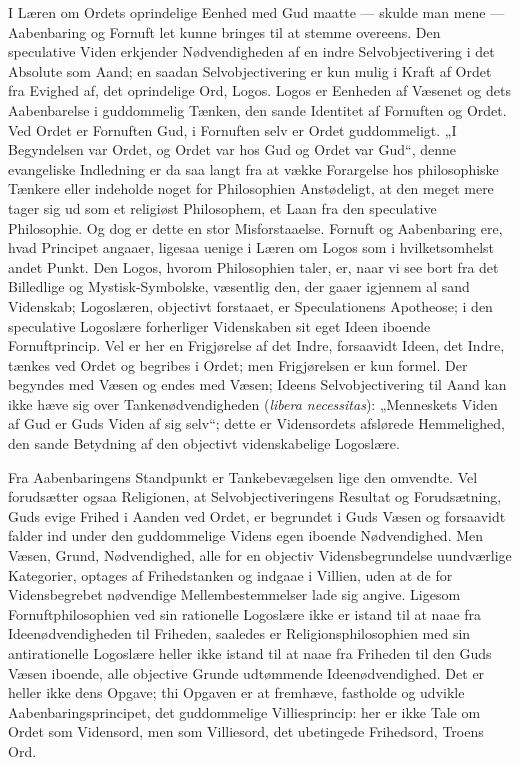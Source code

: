 \documentclass[12pt]{book}
\begin{document}
I Læren om Ordets oprindelige Eenhed med Gud maatte --- skulde man
mene --- Aabenbaring og Fornuft
let kunne bringes til at stemme overeens. Den speculative Viden
erkjender Nødvendigheden af en indre Selvobjectivering i det
Absolute som Aand; en saadan Selvobjectivering er kun mulig i Kraft
af Ordet fra Evighed af, det oprindelige Ord, Logos. Logos er
Eenheden af Væsenet og dets Aabenbarelse i guddommelig Tænken, den
sande Identitet af Fornuften og Ordet. Ved Ordet er Fornuften Gud, i
Fornuften selv er Ordet guddommeligt. „I Begyndelsen var Ordet, og
Ordet var hos Gud og Ordet var Gud“, denne evangeliske Indledning er
da saa langt fra at vække Forargelse hos philosophiske Tænkere eller
indeholde noget for Philosophien Anstødeligt, at den meget mere
tager sig ud som et religiøst Philosophem, et Laan fra den
speculative Philosophie. Og dog er dette en stor Misforstaaelse.
Fornuft og Aabenbaring ere, hvad Principet angaaer, ligesaa uenige i
Læren om Logos som i hvilketsomhelst andet Punkt. Den Logos, hvorom
Philosophien taler, er, naar vi see bort fra det Billedlige og
Mystisk-Symbolske, væsentlig den, der gaaer igjennem al sand
Videnskab; Logoslæren, objectivt forstaaet, er Speculationens
Apotheose; i den speculative Logoslære forherliger Videnskaben sit
eget Ideen iboende Fornuftprincip. Vel er her en Frigjørelse af det
Indre, forsaavidt Ideen, det Indre, tænkes ved Ordet og begribes i
Ordet; men Frigjørelsen er kun formel. Der begyndes med Væsen og
endes med Væsen; Ideens Selvobjectivering til Aand kan ikke hæve sig
over Tankenødvendigheden (\textit{libera necessitas}): „Menneskets
Viden af Gud er Guds Viden af sig selv“; dette er Vidensordets
afslørede Hemmelighed, den sande Betydning af den objectivt
videnskabelige Logoslære.

Fra Aabenbaringens Standpunkt er Tankebevægelsen lige den omvendte.
Vel forudsætter ogsaa Religionen, at Selvobjectiveringens Resultat
og Forudsætning, Guds evige Frihed i Aanden ved Ordet, er begrundet
i Guds
Væsen og forsaavidt falder ind under den guddommelige Videns egen
iboende Nødvendighed. Men Væsen, Grund, Nødvendighed, alle for en
objectiv Vidensbegrundelse uundværlige Kategorier, optages af
Frihedstanken og indgaae i Villien, uden at de for Vidensbegrebet
nødvendige Mellembestemmelser lade sig angive. Ligesom
Fornuftphilosophien ved sin rationelle Logoslære ikke er istand til
at naae fra Ideenødvendigheden til Friheden, saaledes er
Religionsphilosophien med sin antirationelle Logoslære heller ikke
istand til at naae fra Friheden til den Guds Væsen iboende, alle
objective Grunde udtømmende Ideenødvendighed. Det er heller ikke
dens Opgave; thi Opgaven er at fremhæve, fastholde og udvikle
Aabenbaringsprincipet, det guddommelige Villiesprincip: her er ikke
Tale om Ordet som Vidensord, men som Villiesord, det ubetingede
Frihedsord, Troens Ord.
\end{document}

